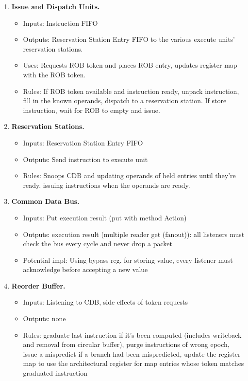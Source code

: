 \documentclass[12pt]{article}
\begin{document}
\begin{enumerate}
    \item \textbf{Issue and Dispatch Units.} 
    \begin{itemize}
        \item[] Inputs: Instruction FIFO
        \item[] Outputs: Reservation Station Entry FIFO to the various execute units' reservation stations.
        \item[] Uses: Requests ROB token and places ROB entry, updates register map with the ROB token.
        \item[] Rules: If ROB token available and instruction ready, unpack instruction, fill in the known operands, 
        dispatch to a reservation station. If store instruction, wait for ROB to empty and issue.
    \end{itemize}
    
    \item \textbf{Reservation Stations.}
    \begin{itemize}
        \item[] Inputs: Reservation Station Entry FIFO
        \item[] Outputs: Send instruction to execute unit
        \item[] Rules: Snoops CDB and updating operands of held entries until they're ready, issuing instructions when 
        the operands are ready.
    \end{itemize}
    
    \item \textbf{Common Data Bus.}
    \begin{itemize}
        \item[] Inputs: Put execution result (put with method Action)
        \item[] Outputs: execution result (multiple reader get (fanout)): all listeners must check the bus every cycle and never drop a packet
        \item[] Potential impl: Using bypass reg. for storing value, every listener must acknowledge before accepting a new value
    \end{itemize}
    
    \item \textbf{Reorder Buffer.}
    \begin{itemize}
        \item[] Inputs: Listening to CDB, side effects of token requests
        \item[] Outputs: none
        \item[] Rules: graduate last instruction if it's been computed (includes writeback and removal from circular
        buffer), purge instructions of wrong epoch, issue a mispredict if a branch had been mispredicted, update the register map to use the architectural register for map entries whose token matches graduated instruction
    \end{itemize}


\end{enumerate}
\end{document}
